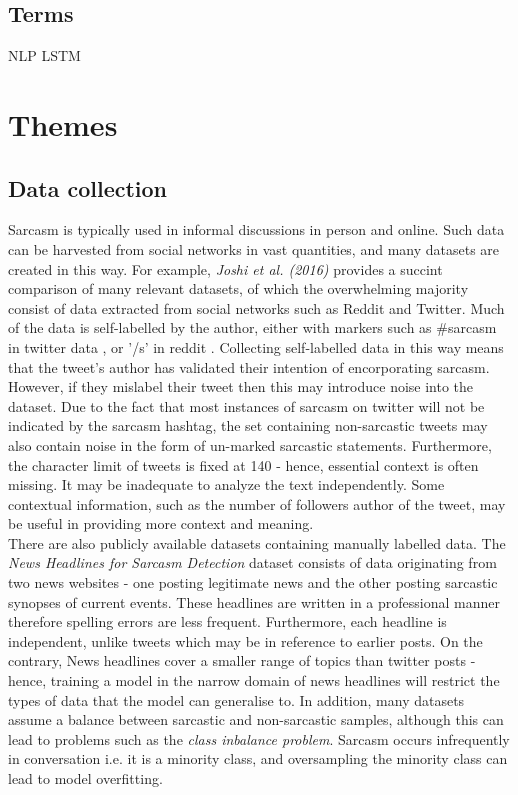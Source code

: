 \documentclass[12pt,a4paper]{article}
\begin{document}
\subsection{Terms}
NLP
LSTM

\newpage

\section{Themes}
\subsection{Data collection}
\noindent Sarcasm is typically used in informal discussions in person and online. Such data can be harvested from social networks in vast quantities, and many datasets are created in this way. For example, \textit{Joshi et al. (2016)} \cite{joshi2016automatic} provides a succint comparison of many relevant datasets, of which the overwhelming majority consist of data extracted from social networks such as Reddit and Twitter. Much of the data is self-labelled by the author, either with markers such as \#sarcasm in twitter data \cite{reyes2013multidimensional, davidov2010semi, ptavcek2014sarcasm}, or '/s' in reddit \cite{khodak2017large}. Collecting self-labelled data in this way means that the tweet's author has validated their intention of encorporating sarcasm. However, if they mislabel their tweet then this may introduce noise into the dataset. Due to the fact that most instances of sarcasm on twitter will not be indicated by the sarcasm hashtag, the set containing non-sarcastic tweets may also contain noise in the form of un-marked sarcastic statements. Furthermore, the character limit of tweets is fixed at 140 - hence, essential context is often missing. It may be inadequate to analyze the text independently. Some contextual information, such as the number of followers author of the tweet, may be useful in providing more context and meaning.\\

\noindent There are also publicly available datasets containing manually labelled data. The \textit{News Headlines for Sarcasm Detection} dataset \cite{misra2019sarcasm} consists of data originating from two news websites - one posting legitimate news and the other posting sarcastic synopses of current events. These headlines are written in a professional manner therefore spelling errors are less frequent. Furthermore, each headline is independent, unlike tweets which may be in reference to earlier posts. On the contrary, News headlines cover a smaller range of topics than twitter posts - hence, training a model in the narrow domain of news headlines will restrict the types of data that the model can generalise to. In addition, many datasets assume a balance between sarcastic and non-sarcastic samples, although this can lead to problems such as the \textit{class inbalance problem}. Sarcasm occurs infrequently in conversation i.e. it is a minority class, and oversampling the minority class can lead to model overfitting.
\vfill
\end{document}
